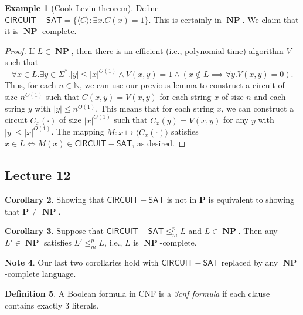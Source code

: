 \documentclass[10pt,letterpaper,cm]{nupset}
\theoremstyle{definition}
\newtheorem{definition}{Definition}[subsection]
\newtheorem{exmp}[definition]{Example}
\newtheorem{note}[definition]{Note}
\theoremstyle{theorem}
\newtheorem{corollary}[definition]{Corollary}
\theoremstyle{remark}
\newcommand{\N}{\mathbb N}
\newcommand{\1}{\mathbf{1}}
\newcommand{\0}{\vec 0}
\DeclareMathOperator{\NP}{\mathbf{NP}}
\begin{document}
\begin{exmp}[Cook-Levin theorem]
Define $\mathsf{CIRCUIT{-}SAT} = \{ \langle C \rangle : \exists x. C(x) = 1\}$. This is certainly in $\NP$. We claim that it is $\NP$-complete.
\end{exmp}
\begin{proof}
If $L \in \NP$, then there is an efficient (i.e.,  polynomial-time) algorithm $V$ such that $$\forall x\in L.\exists y\in \Sigma^{\ast}.|y|\leq |x|^{O(1)} \land V(x,y) =1 \land (x\notin L \implies \forall y. V(x,y)=0).$$ Thus, for each $n\in \N$, we can use our previous lemma to construct a circuit of size $n^{O(1)}$ such that $C(x,y) = V(x,y)$ for each string $x$ of size $n$ and each string $y$ with $|y|\leq n^{O(1)}$. This means that for each string $x$, we can construct a circuit $C_x(\cdot)$ of size $|x|^{O(1)}$ such that $C_x(y) = V(x,y)$ for any $y$ with $|y|\leq |x|^{O(1)}$. The mapping $M: x\mapsto \langle C_x(\cdot) \rangle$ satisfies $x\in L \iff M(x) \in \mathsf{CIRCUIT{-}SAT}$, as desired.  
\end{proof}

\subsection{Lecture 12}

\begin{corollary}
Showing that $\mathsf{CIRCUIT{-}SAT}$ is not in $\mathbf{P}$ is equivalent to showing that $\mathbf{P} \ne \NP$.
\end{corollary}

\begin{corollary}
Suppose that $\mathsf{CIRCUIT{-}SAT} \leq_m^p L$ and $L\in \NP$. Then any $L' \in \NP$ satisfies $L' \leq_m^p L$, i.e., $L$ is $\NP$-complete.
\end{corollary}

\begin{note}
Our last two corollaries hold with $\mathsf{CIRCUIT{-}SAT}$ replaced by any $\NP$-complete language. 
\end{note}

\begin{definition}
A Boolean formula in CNF is a \textit{3cnf formula} if each clause contains exactly $3$ literals.  
\end{definition}
\end{document}
